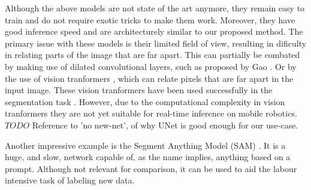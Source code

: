 Although the above models are not state of the art anymore, they remain easy to train and do not require exotic tricks to make them work. Moreover, they have good inference speed and are architecturely similar to our proposed method. The primary issue with these models is their limited field of view, resulting in dificulty in relating parts of the image that are far apart. This can partially be combated by making use of dilated convolutional layers, such as proposed by Gao \cite{gao2023rethinking}. Or by the use of vision tranformers \cite{dosovitskiy2021image}, which can relate pixels that are far apart in the input image. These vision tranformers have been used successfully in the segmentation task \cite{xie2021segformer,chen2022vision}. However, due to the computational complexity in vision tranformers they are not yet suitable for real-time inference on mobile robotics. $TODO$ Reference to 'no new-net', of why UNet is good enough for our use-case.

Another impressive example is the Segment Anything Model (SAM) \cite{kirillov2023segment}. It is a huge, and slow, network capable of, as the name implies, anything based on a prompt. Although not relevant for comparison, it can be used to aid the labour intensive task of labeling new data.
